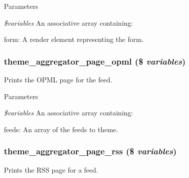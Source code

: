 \begin{DoxyParams}{Parameters}
\item[{\em \$variables}]An associative array containing:
\begin{DoxyItemize}
\item form: A render element representing the form. 
\end{DoxyItemize}\end{DoxyParams}
\hypertarget{group__themeable_ga1faa7b7c87cd772cb1005e83bb331616}{
\subsubsection[{theme\_\-aggregator\_\-page\_\-opml}]{\setlength{\rightskip}{0pt plus 5cm}theme\_\-aggregator\_\-page\_\-opml (\$ {\em variables})}}
\label{group__themeable_ga1faa7b7c87cd772cb1005e83bb331616}
Prints the OPML page for the feed.


\begin{DoxyParams}{Parameters}
\item[{\em \$variables}]An associative array containing:
\begin{DoxyItemize}
\item feeds: An array of the feeds to theme. 
\end{DoxyItemize}\end{DoxyParams}
\hypertarget{group__themeable_ga458bff845ec41963f5acb8a81561ef98}{
\subsubsection[{theme\_\-aggregator\_\-page\_\-rss}]{\setlength{\rightskip}{0pt plus 5cm}theme\_\-aggregator\_\-page\_\-rss (\$ {\em variables})}}
\label{group__themeable_ga458bff845ec41963f5acb8a81561ef98}
Prints the RSS page for a feed.


